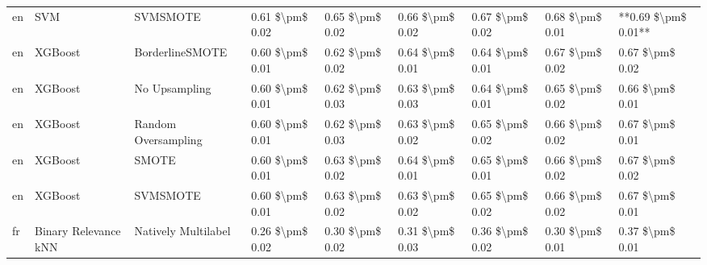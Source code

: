 \begin{tabular}{lllllllll}
      en &                             SVM &                      SVMSMOTE & 0.61 \$\textbackslash pm\$ 0.02 &           0.65 \$\textbackslash pm\$ 0.02 &       0.66 \$\textbackslash pm\$ 0.02 &        0.67 \$\textbackslash pm\$ 0.02 &                         0.68 \$\textbackslash pm\$ 0.01 & **0.69 \$\textbackslash pm\$ 0.01** \\
      en &                         XGBoost &               BorderlineSMOTE & 0.60 \$\textbackslash pm\$ 0.01 &           0.62 \$\textbackslash pm\$ 0.02 &       0.64 \$\textbackslash pm\$ 0.01 &        0.64 \$\textbackslash pm\$ 0.01 &                         0.67 \$\textbackslash pm\$ 0.02 &     0.67 \$\textbackslash pm\$ 0.02 \\
      en &                         XGBoost &                 No Upsampling & 0.60 \$\textbackslash pm\$ 0.01 &           0.62 \$\textbackslash pm\$ 0.03 &       0.63 \$\textbackslash pm\$ 0.03 &        0.64 \$\textbackslash pm\$ 0.01 &                         0.65 \$\textbackslash pm\$ 0.02 &     0.66 \$\textbackslash pm\$ 0.01 \\
      en &                         XGBoost &           Random Oversampling & 0.60 \$\textbackslash pm\$ 0.01 &           0.62 \$\textbackslash pm\$ 0.03 &       0.63 \$\textbackslash pm\$ 0.02 &        0.65 \$\textbackslash pm\$ 0.02 &                         0.66 \$\textbackslash pm\$ 0.02 &     0.67 \$\textbackslash pm\$ 0.01 \\
      en &                         XGBoost &                         SMOTE & 0.60 \$\textbackslash pm\$ 0.01 &           0.63 \$\textbackslash pm\$ 0.02 &       0.64 \$\textbackslash pm\$ 0.01 &        0.65 \$\textbackslash pm\$ 0.01 &                         0.66 \$\textbackslash pm\$ 0.02 &     0.67 \$\textbackslash pm\$ 0.02 \\
      en &                         XGBoost &                      SVMSMOTE & 0.60 \$\textbackslash pm\$ 0.01 &           0.63 \$\textbackslash pm\$ 0.02 &       0.63 \$\textbackslash pm\$ 0.02 &        0.65 \$\textbackslash pm\$ 0.02 &                         0.66 \$\textbackslash pm\$ 0.02 &     0.67 \$\textbackslash pm\$ 0.01 \\
      fr &            Binary Relevance kNN &           Natively Multilabel & 0.26 \$\textbackslash pm\$ 0.02 &           0.30 \$\textbackslash pm\$ 0.02 &       0.31 \$\textbackslash pm\$ 0.03 &        0.36 \$\textbackslash pm\$ 0.02 &                         0.30 \$\textbackslash pm\$ 0.01 &     0.37 \$\textbackslash pm\$ 0.01 \\

\end{tabular}
